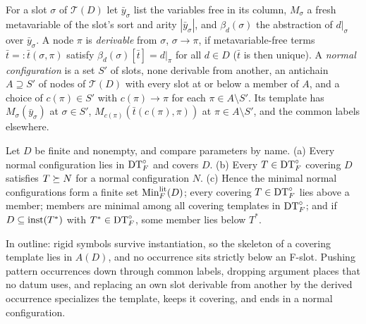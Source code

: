 \begin{definition}\label{def:exp:normal}
For a slot $\sigma$ of $\mathcal T(D)$ let $\bar y_\sigma$ list the variables free in its column, $M_\sigma$ a fresh metavariable of the slot's sort and arity $|\bar y_\sigma|$, and $\beta_d(\sigma)$ the abstraction of $d|_\sigma$ over $\bar y_\sigma$. A node $\pi$ is \emph{derivable} from $\sigma$, $\sigma\to\pi$, if metavariable-free terms $\bar t=:\bar t(\sigma,\pi)$ satisfy $\beta_d(\sigma)[\bar t]=d|_\pi$ for all $d\in D$ ($\bar t$ is then unique). A \emph{normal configuration} is a set $S'$ of slots, none derivable from another, an antichain $A\supseteq S'$ of nodes of $\mathcal T(D)$ with every slot at or below a member of $A$, and a choice of $c(\pi)\in S'$ with $c(\pi)\to\pi$ for each $\pi\in A\setminus S'$. Its template has $M_\sigma(\bar y_\sigma)$ at $\sigma\in S'$, $M_{c(\pi)}(\bar t(c(\pi),\pi))$ at $\pi\in A\setminus S'$, and the common labels elsewhere.
\end{definition}

\begin{proposition}\label{prop:exp:normal}
Let $D$ be finite and nonempty, and compare parameters by name.
\textup{(a)} Every normal configuration lies in $\mathrm{DT}^{\circ}_{F}$ and covers $D$.
\textup{(b)} Every $T\in\mathrm{DT}^{\circ}_{F}$ covering $D$ satisfies $T\succeq N$ for a normal configuration $N$.
\textup{(c)} Hence the minimal normal configurations form a finite set $\mathrm{Min}^{\mathrm{lit}}_F(D)$; every covering $T\in\mathrm{DT}^{\circ}_{F}$ lies above a member; members are minimal among all covering templates in $\mathrm{DT}^{\circ}_{F}$; and if $D\subseteq\mathrm{inst}(T^*)$ with $T^*\in\mathrm{DT}^{\circ}_{F}$, some member lies below $T^*$.
\end{proposition}

In outline: rigid symbols survive instantiation, so the skeleton of a covering template lies in $A(D)$, and no occurrence sits strictly below an F-slot. Pushing pattern occurrences down through common labels, dropping argument places that no datum uses, and replacing an own slot derivable from another by the derived occurrence specializes the template, keeps it covering, and ends in a normal configuration.

